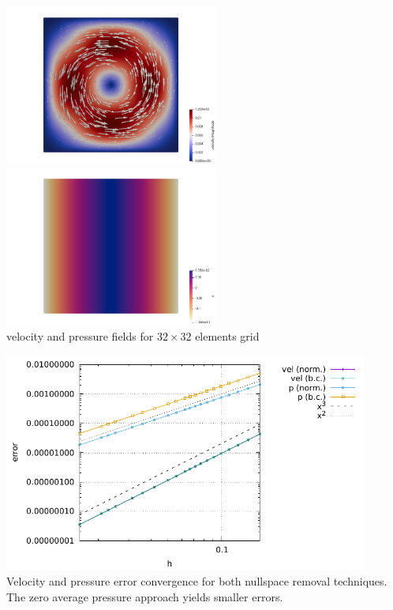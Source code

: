 \begin{center}
\includegraphics[width=7cm]{python_codes/fieldstone_18/results/mms/vel}
\includegraphics[width=7cm]{python_codes/fieldstone_18/results/mms/pressure}\\
{\captionfont velocity and pressure fields for $32\times 32$ elements grid}
\end{center}

\begin{center}
\includegraphics[width=12cm]{python_codes/fieldstone_18/results/mms/errors}\\
{\captionfont Velocity and pressure error convergence for both nullspace removal 
techniques. The zero average pressure approach yields smaller errors.}
\end{center}

